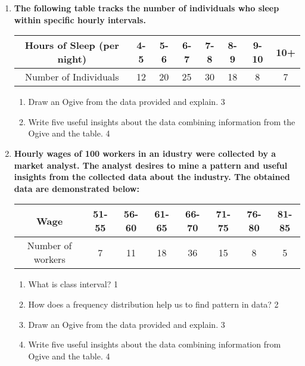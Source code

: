 \documentclass[a4paper,oneside]{book}
\begin{document}
\begin{enumerate}
     \item
	  \textbf{The following table tracks the number of individuals who sleep 
	  within specific hourly intervals. }
	  
\begin{table}[h]
  \centering
\begin{tabular}{c|c|c|c|c|c|c|c}
Hours of Sleep (per night) & 4-5   & 5-6   & 6-7   & 7-8   & 8-9   & 9-10  & 10+   \\ \hline
Number of Individuals      & 12    & 20    & 25    & 30    & 18    & 8     & 7     
\end{tabular}
\end{table}


  \begin{enumerate}
    \item  
	Draw an Ogive from the data provided and explain. \hfill 3
    \item
	Write five useful insights about the data combining information from 
	the Ogive and the table. \hfill 4
  \end{enumerate}
  
       \item
	  \textbf{Hourly wages of 100 workers in an idustry were collected by a 
	  market analyst. The analyst desires to mine a pattern and useful insights 
	  from the collected data about the industry. The obtained data are 
	  demonstrated below:}
	  
	  \begin{table}[h]
	  \centering
\begin{tabular}{c|c|c|c|c|c|c|c}
Wage              & 51-55 & 56-60 & 61-65 & 66-70 & 71-75 & 76-80 & 81-85 \\ \hline
Number of workers & 7     & 11    & 18    & 36    & 15    & 8     & 5    
\end{tabular}
\end{table}

  \begin{enumerate}    \item
	What is class interval? \hfill 1
    \item
	How does a frequency distribution help us to find pattern in data? \hfill 2
    \item  
	Draw an Ogive from the data provided and explain. \hfill 3
    \item
	Write five useful insights about the data combining information from Ogive and the table. \hfill 4
  \end{enumerate}
  

\end{enumerate}
\end{document}
